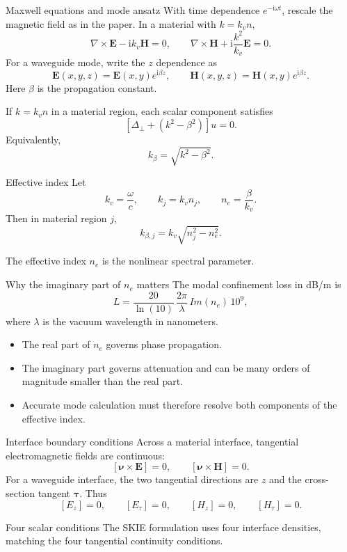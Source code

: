 \documentclass[aspectratio=169,10pt]{beamer}
\newcommand{\ii}{\mathrm i}
\newcommand{\nvec}{\bm{\nu}}
\newcommand{\tvec}{\bm{\tau}}
\newcommand{\E}{\bm{E}}
\newcommand{\Hfield}{\bm{H}}
\begin{document}
\begin{frame}{Maxwell equations and mode ansatz}
\small
With time dependence $e^{-\ii\omega t}$, rescale the magnetic field as in the
paper. In a material with $k=k_vn$,
\[
  \nabla\times\E-\ii k_v\Hfield=0,
  \qquad
  \nabla\times\Hfield+\ii\frac{k^2}{k_v}\E=0.
\]
For a waveguide mode, write the $z$ dependence as
\[
  \E(x,y,z)=\E(x,y)e^{\ii\beta z},
  \qquad
  \Hfield(x,y,z)=\Hfield(x,y)e^{\ii\beta z}.
\]
Here $\beta$ is the propagation constant.

If $k=k_v n$ in a material region, each scalar component satisfies
\[
  \left[\Delta_\perp+(k^2-\beta^2)\right]u=0.
\]
Equivalently,
\[
  k_{\beta}= \sqrt{k^2-\beta^2}.
\]
\end{frame}

\begin{frame}{Effective index}
\small
Let
\[
  k_v=\frac{\omega}{c},\qquad k_j=k_v n_j,
  \qquad n_e=\frac{\beta}{k_v}.
\]
Then in material region $j$,
\[
  k_{\beta,j}=k_v\sqrt{n_j^2-n_e^2}.
\]

\vspace{2mm}
The effective index $n_e$ is the nonlinear spectral parameter.
\end{frame}

\begin{frame}{Why the imaginary part of $n_e$ matters}
\small
The modal confinement loss in dB/m is
\[
  L=\frac{20}{\ln(10)}\,\frac{2\pi}{\lambda}\,Im(n_e)\,10^9,
\]
where $\lambda$ is the vacuum wavelength in nanometers.

\begin{itemize}
  \item The real part of $n_e$ governs phase propagation.
  \item The imaginary part governs attenuation and can be many orders of
  magnitude smaller than the real part.
  \item Accurate mode calculation must therefore resolve both components of
  the effective index.
\end{itemize}
\end{frame}

\begin{frame}{Interface boundary conditions}
\small
Across a material interface, tangential electromagnetic fields are continuous:
\[
  [\nvec\times\E]=0,\qquad [\nvec\times\Hfield]=0.
\]
For a waveguide interface, the two tangential directions are $z$ and
the cross-section tangent $\tvec$. Thus
\[
  [E_z]=0,\qquad [E_\tau]=0,\qquad
  [H_z]=0,\qquad [H_\tau]=0.
\]

\begin{block}{Four scalar conditions}
The SKIE formulation uses four interface densities, matching the four
tangential continuity conditions.
\end{block}
\end{frame}
\end{document}
